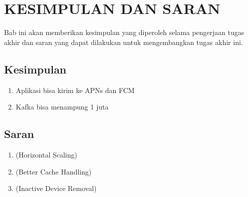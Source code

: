 \chapter{KESIMPULAN DAN SARAN}
\par Bab ini akan memberikan kesimpulan yang diperoleh selama
pengerjaan tugas akhir dan saran yang dapat dilakukan untuk
mengembangkan tugas akhir ini.

\section{Kesimpulan}
\begin{enumerate}
    \item Aplikasi bisa kirim ke APNs dan FCM %
    \item Kafka bisa menampung 1 juta %
\end{enumerate}

\section{Saran}
\begin{enumerate}
    \item (Horizontal Scaling) %
    \item (Better Cache Handling) %
    \item (Inactive Device Removal) %
\end{enumerate}
